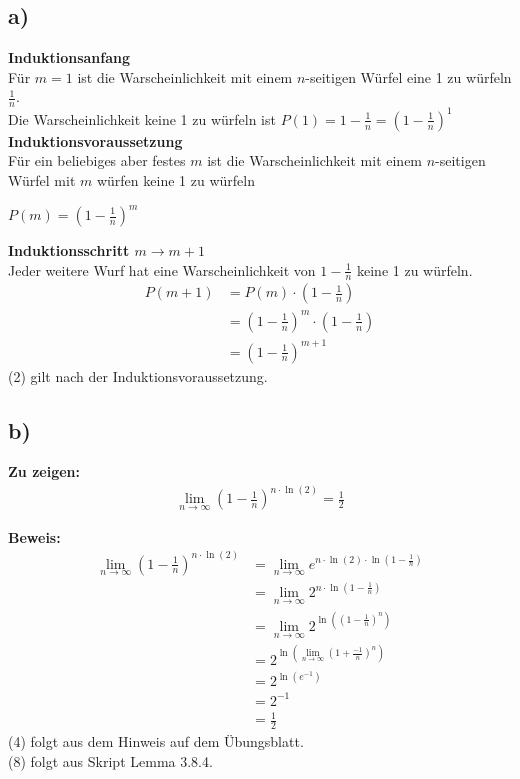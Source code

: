 \documentclass[a4paper]{scrartcl}
\begin{document}
\subsection*{a)}
\textbf{Induktionsanfang} \\
Für $m = 1$ ist die Warscheinlichkeit mit einem $n$-seitigen Würfel eine 1 zu würfeln $\frac{1}{n}$. \\
Die Warscheinlichkeit keine 1 zu würfeln ist $P(1) = 1 - \frac{1}{n} = \left(1 - \frac{1}{n}\right)^1$ \\
\textbf{Induktionsvoraussetzung} \\
Für ein beliebiges aber festes $m$ ist die Warscheinlichkeit mit einem $n$-seitigen Würfel mit $m$ 
würfen keine 1 zu würfeln
\begin{center}
	$P(m) = \left(1 - \frac{1}{n}\right)^m$ 
\end{center}
\textbf{Induktionsschritt $m \to m+1$} \\
Jeder weitere Wurf hat eine Warscheinlichkeit von $1 - \frac{1}{n}$ keine 1 zu würfeln. 
\begin{align}
	P(m+1) &= P(m) \cdot \left(1 - \frac{1}{n}\right) \\
	&= \left(1 - \frac{1}{n}\right)^m \cdot \left(1 - \frac{1}{n}\right) \\
	&= \left(1 - \frac{1}{n}\right)^{m+1}
\end{align}
(2) gilt nach der Induktionsvoraussetzung.

\subsection*{b)}
\textbf{Zu zeigen:} 
\begin{align*}
\lim_{n \to \infty} \left(1 - \frac{1}{n}\right)^{n \cdot \ln(2)} = \frac{1}{2}
\end{align*}

\textbf{Beweis:} 
\begin{align}
\lim_{n \to \infty} \left(1 - \frac{1}{n}\right)^{n \cdot \ln(2)} &= \lim_{n \to \infty} e^{n \cdot \ln(2) \cdot  \ln(1-\frac{1}{n})} \\
&= \lim_{n \to \infty} 2^{n \cdot \ln(1-\frac{1}{n})} \\
&= \lim_{n \to \infty} 2^{\ln((1-\frac{1}{n})^n)} \\
&= 2^{\ln(\lim_{n \to \infty} (1+\frac{-1}{n})^n)} \\
&= 2^{\ln(e^{-1})} \\
&= 2^{-1} \\
&= \frac{1}{2}
\end{align}
(4) folgt aus dem Hinweis auf dem Übungsblatt. \\ 
(8) folgt aus Skript Lemma 3.8.4. 
\end{document}
